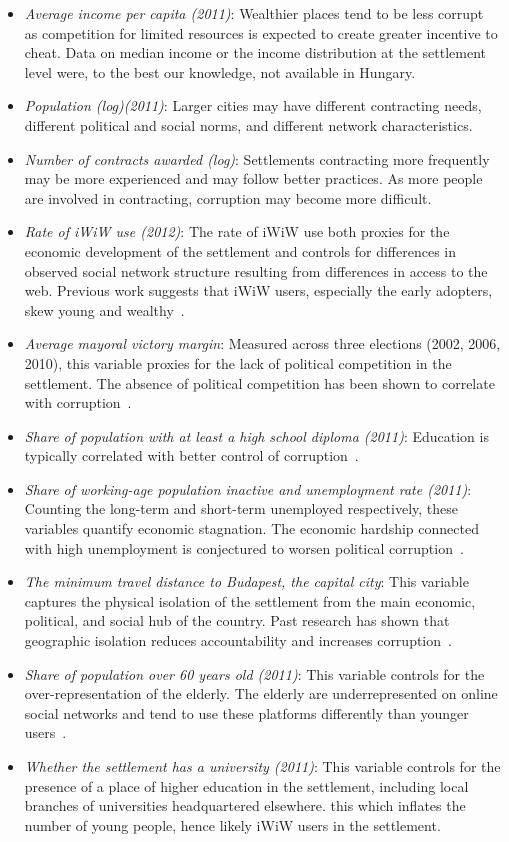 \begin{itemize}
\item \textit{Average income per capita (2011)}: Wealthier places tend to be less corrupt~\cite{mungiu2013controlling} as competition for limited resources is expected to create greater incentive to cheat. Data on median income or the income distribution at the settlement level were, to the best our knowledge, not available in Hungary.
\item \textit{Population (log)(2011)}: Larger cities may have different contracting needs, different political and social norms, and different network characteristics.
\item \textit{Number of contracts awarded (log)}: Settlements contracting more frequently may be more experienced and may follow better practices. As more people are involved in contracting, corruption may become more difficult.
\item \textit{Rate of iWiW use (2012)}: The rate of iWiW use both proxies for the economic development of the settlement and controls for differences in observed social network structure resulting from differences in access to the web. Previous work suggests that iWiW users, especially the early adopters, skew young and wealthy~\cite{lengyel2015geographies}.
\item \textit{Average mayoral victory margin}: Measured across three elections (2002, 2006, 2010), this variable proxies for the lack of political competition in the settlement. The absence of political competition has been shown to correlate with corruption~\cite{broms2017procurement}.
\item \textit{Share of population with at least a high school diploma (2011)}: Education is typically correlated with better control of corruption~\cite{rothstein2005all}.
\item \textit{Share of working-age population inactive and unemployment rate (2011)}: Counting the long-term and short-term unemployed respectively, these variables quantify economic stagnation. The economic hardship connected with high unemployment is conjectured to worsen political corruption~\cite{sung2004democracy}.
\item \textit{The minimum travel distance to Budapest, the capital city}: This variable captures the physical isolation of the settlement from the main economic, political, and social hub of the country. Past research has shown that geographic isolation reduces accountability and increases corruption~\cite{campante2014isolated}. 
\item \textit{Share of population over 60 years old (2011)}: This variable controls for the over-representation of the elderly. The elderly are underrepresented on online social networks and tend to use these platforms differently than younger users~\cite{pfeil2009age}.
\item \textit{Whether the settlement has a university (2011)}: This variable controls for the presence of a place of higher education in the settlement, including local branches of universities headquartered elsewhere. this which inflates the number of young people, hence likely iWiW users in the settlement.
\end{itemize}

